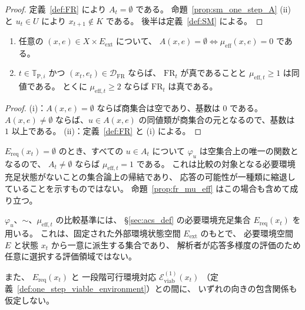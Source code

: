 \begin{proof}
定義~\ref{def:FR} により $A_t=\emptyset$ である。
命題~\ref{prop:sm_one_step_A} (ii) と $u_t\in U$ により $x_{t+1}\notin K$ である。
後半は定義~\ref{def:SM} による。
\end{proof}

\begin{proposition}[局所 FR と応答多様度]
\label{prop:fr_mu_eff}
\begin{enumerate}[label=(\roman*)]
  \item 任意の $(x,e)\in X\times E_{\mathrm{ext}}$ について、
  $A(x,e)=\emptyset\iff\mu_{\mathrm{eff}}(x,e)=0$ である。
  \item $t\in\mathbb{T}_{\mathrm{P},i}$ かつ $(x_t,e_t)\in\mathcal{D}_{\mathrm{FR}}$ ならば、
  $\mathrm{FR}_t$ が真であることと $\mu_{\mathrm{eff},t}\ge1$ は同値である。
  とくに $\mu_{\mathrm{eff},t}\ge2$ ならば $\mathrm{FR}_t$ は真である。
\end{enumerate}
\end{proposition}

\begin{proof}
(i)：$A(x,e)=\emptyset$ ならば商集合は空であり、基数は $0$ である。
$A(x,e)\neq\emptyset$ ならば、$u\in A(x,e)$ の同値類が商集合の元となるので、基数は $1$ 以上である。
(ii)：定義~\ref{def:FR} と (i) による。
\end{proof}

\begin{remark}[$E_{\mathrm{req}}(x_t)=\emptyset$ の場合の応答多様度]
\label{rem:mu_eff_empty_req}
$E_{\mathrm{req}}(x_t)=\emptyset$ のとき、すべての $u\in A_t$ について $\varphi_u$ は空集合上の唯一の関数となるので、
$A_t\neq\emptyset$ ならば $\mu_{\mathrm{eff},t}=1$ である。
これは比較の対象となる必要環境充足状態がないことの集合論上の帰結であり、
応答の可能性が一種類に縮退していることを示すものではない。
命題~\ref{prop:fr_mu_eff} はこの場合も含めて成り立つ。
\end{remark}

\begin{remark}[環境比較基準の内在性]
\label{rem:env_basis_intrinsic}
$\varphi_u$、$\sim$、$\mu_{\mathrm{eff},t}$ の比較基準には、
\S\ref{sec:acs_def} の必要環境充足集合
$E_{\mathrm{req}}(x_t)$
を用いる。
これは、固定された外部環境状態空間 $E_{\mathrm{ext}}$ のもとで、
必要環境空間 $E$ と状態 $x_t$ から一意に派生する集合であり、
解析者が応答多様度の評価のため任意に選択する評価領域ではない。

また、
$E_{\mathrm{req}}(x_t)$ と
一段階可行環境対応
$\mathcal{E}_{\mathrm{viab}}^{(1)}(x_t)$
（定義~\ref{def:one_step_viable_environment}）との間に、
いずれの向きの包含関係も仮定しない。
\end{remark}

